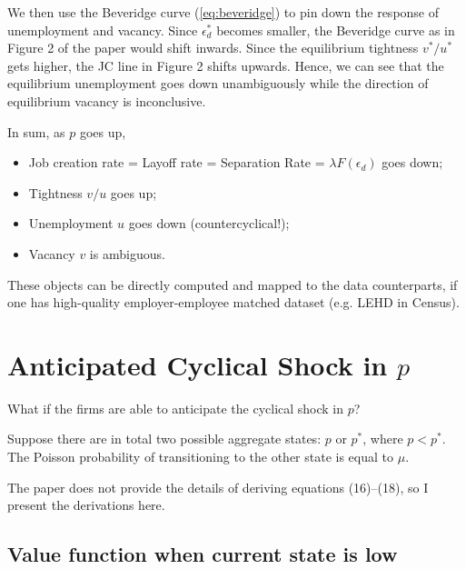 \documentclass[12pt]{article}
\begin{document}
We then use the Beveridge curve (\ref{eq:beveridge}) to pin down the response of unemployment and vacancy. Since $\epsilon_d^*$ becomes smaller, the Beveridge curve as in Figure 2 of the paper would shift inwards. Since the equilibrium tightness $v^*/u^*$ gets higher, the JC line in Figure 2 shifts upwards. Hence, we can see that the equilibrium unemployment goes down unambiguously while the direction of equilibrium vacancy is inconclusive. 

In sum, as $p$ goes up,
\begin{itemize}
	\item Job creation rate = Layoff rate = Separation Rate = $\lambda F(\epsilon_d)$ goes down;
	\item Tightness $v/u$ goes up;
	\item Unemployment $u$ goes down (countercyclical!);
	\item Vacancy $v$ is ambiguous.
\end{itemize}   
These objects can be directly computed and mapped to the data counterparts, if one has high-quality employer-employee matched dataset (e.g. LEHD in Census).

\section{Anticipated Cyclical Shock in $p$}

What if the firms are able to anticipate the cyclical shock in $p$?

Suppose there are in total two possible aggregate states: $p$ or $p^*$, where $p < p^*$. The Poisson probability of transitioning to the other state is equal to $\mu$. 

The paper does not provide the details of deriving equations (16)--(18), so I present the derivations here.

\subsection{Value function when current state is low}
\end{document}
